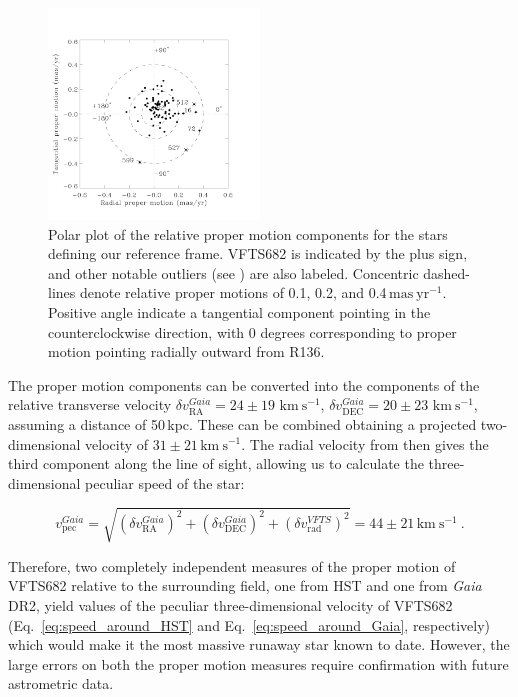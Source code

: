 \documentclass[a4paper,fleqn,usenatbib]{mnras}
\newcommand{\kms}{{\,\mathrm{km\ s^{-1}}}}
\DeclareRobustCommand{\Eqref}[1]{Eq.~\ref{#1}}
\begin{document}
\begin{figure}%
  \centering
  \includegraphics[width=0.5\textwidth]{figures/figure_polar_682-1.pdf}
  \caption{Polar plot of the relative proper motion components for the stars
    defining our reference frame. VFTS682 is indicated by the plus sign, and
    other notable outliers (see \citet{lennon:18}) are also labeled. Concentric dashed-lines denote relative proper motions of
    0.1, 0.2, and 0.4$\,\mathrm{mas\ yr^{-1}}$. Positive angle
    indicate a tangential component pointing in the counterclockwise
    direction, with 0 degrees corresponding to proper motion pointing
    radially outward from R136.
  }
  \label{fig:pm_polar}
\end{figure}



The proper motion components can be converted into
the components of the relative transverse velocity $\delta v_\mathrm{RA}^{Gaia}=24\pm19\,\kms$,
$\delta v_\mathrm{DEC}^{Gaia}=20\pm23\,\kms$, assuming a distance of
50\,kpc. These can be combined obtaining a projected two-dimensional
velocity of $31\pm21\kms$. %
The radial velocity from
\cite{bestenlehner:11} then gives the third component along
the line of sight, allowing us to calculate the three-dimensional
peculiar speed of the star:

\begin{equation}
  \label{eq:speed_around_Gaia}
  v_\mathrm{pec}^{Gaia} = \sqrt{\left(\delta v_\mathrm{RA}^{Gaia}\right)^2
    +\left(\delta v_\mathrm{DEC}^{Gaia}\right)^2+\left(\delta
      v_\mathrm{rad}^{VFTS}\right)^2} = 44 \pm 21
  \kms \ .
\end{equation}

Therefore, two completely independent measures of the proper motion of
VFTS682 relative to the surrounding field, one from HST and one from
\emph{Gaia} DR2, yield values of the peculiar three-dimensional
velocity of VFTS682 (\Eqref{eq:speed_around_HST} and
\Eqref{eq:speed_around_Gaia}, respectively) which would make it the most massive runaway star
known to date. However, the large errors on both the proper motion measures
require confirmation with future astrometric data. 
\end{document}
